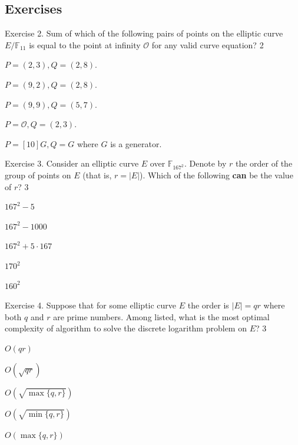 \documentclass[../../book.tex]{subfiles}
\begin{document}
\subsection{Exercises}


\begin{xexercise}
    {Exercise 2.}
    {Sum of which of the following pairs of points on the elliptic curve $E/\mathbb{F}_{11}$ is equal to the point at infinity $\mathcal{O}$ for any valid curve equation?}
    {2}
    {
        \item $P=(2,3),Q=(2,8)$.
        \item $P=(9,2),Q=(2,8)$.
        \item $P=(9,9),Q=(5,7)$.
        \item $P=\mathcal{O},Q=(2,3)$.
        \item $P=[10]G,Q=G$ where $G$ is a generator.
    }
\end{xexercise}

\begin{xexercise}
    {Exercise 3.}
    {Consider an elliptic curve $E$ over $\mathbb{F}_{167^2}$. Denote by $r$ the order of the group of points on $E$ (that is, $r=|E|$). Which of the following \textbf{can} be the value of $r$?}
    {3}
    {
        \item $167^2 - 5$
        \item $167^2-1000$
        \item $167^2+5 \cdot 167$
        \item $170^2$
        \item $160^2$
    }
\end{xexercise}

\begin{xexercise}
    {Exercise 4.}
    {Suppose that for some elliptic curve $E$ the order is $|E| = qr$ where both $q$ and $r$ are prime numbers. Among listed, what is the most optimal complexity of algorithm to solve the discrete logarithm problem on $E$?}
    {3}
    {
        \item $O(qr)$
        \item $O(\sqrt{qr})$
        \item $O(\sqrt{\max\{q,r\}})$
        \item $O(\sqrt{\min\{q,r\}})$
        \item $O(\max\{q,r\})$
    }
\end{xexercise}
\end{document}
